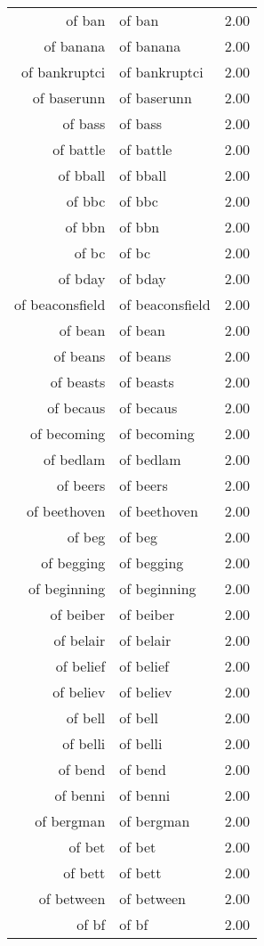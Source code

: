 \begin{table}[ht]
\begin{tabular}{rlr}
  of ban & of ban & 2.00 \\ 
  of banana & of banana & 2.00 \\ 
  of bankruptci & of bankruptci & 2.00 \\ 
  of baserunn & of baserunn & 2.00 \\ 
  of bass & of bass & 2.00 \\ 
  of battle & of battle & 2.00 \\ 
  of bball & of bball & 2.00 \\ 
  of bbc & of bbc & 2.00 \\ 
  of bbn & of bbn & 2.00 \\ 
  of bc & of bc & 2.00 \\ 
  of bday & of bday & 2.00 \\ 
  of beaconsfield & of beaconsfield & 2.00 \\ 
  of bean & of bean & 2.00 \\ 
  of beans & of beans & 2.00 \\ 
  of beasts & of beasts & 2.00 \\ 
  of becaus & of becaus & 2.00 \\ 
  of becoming & of becoming & 2.00 \\ 
  of bedlam & of bedlam & 2.00 \\ 
  of beers & of beers & 2.00 \\ 
  of beethoven & of beethoven & 2.00 \\ 
  of beg & of beg & 2.00 \\ 
  of begging & of begging & 2.00 \\ 
  of beginning & of beginning & 2.00 \\ 
  of beiber & of beiber & 2.00 \\ 
  of belair & of belair & 2.00 \\ 
  of belief & of belief & 2.00 \\ 
  of believ & of believ & 2.00 \\ 
  of bell & of bell & 2.00 \\ 
  of belli & of belli & 2.00 \\ 
  of bend & of bend & 2.00 \\ 
  of benni & of benni & 2.00 \\ 
  of bergman & of bergman & 2.00 \\ 
  of bet & of bet & 2.00 \\ 
  of bett & of bett & 2.00 \\ 
  of between & of between & 2.00 \\ 
  of bf & of bf & 2.00 \\ 

\end{tabular}
\end{table}
